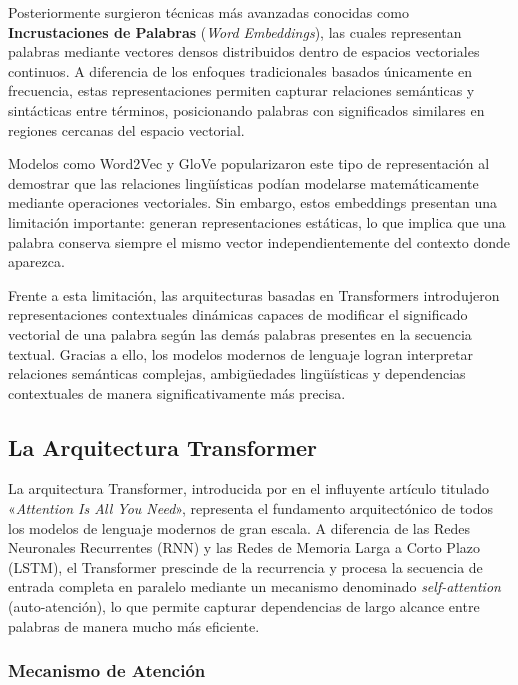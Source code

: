 Posteriormente surgieron técnicas más avanzadas conocidas como \textbf{Incrustaciones de Palabras} (\textit{Word Embeddings}), las cuales representan palabras mediante vectores densos distribuidos dentro de espacios vectoriales continuos. A diferencia de los enfoques tradicionales basados únicamente en frecuencia, estas representaciones permiten capturar relaciones semánticas y sintácticas entre términos, posicionando palabras con significados similares en regiones cercanas del espacio vectorial.

Modelos como Word2Vec \parencite{tec_mikolov2013word2vec} y GloVe \parencite{gl_pennington2014glove} popularizaron este tipo de representación al demostrar que las relaciones lingüísticas podían modelarse matemáticamente mediante operaciones vectoriales. Sin embargo, estos embeddings presentan una limitación importante: generan representaciones estáticas, lo que implica que una palabra conserva siempre el mismo vector independientemente del contexto donde aparezca.

Frente a esta limitación, las arquitecturas basadas en Transformers introdujeron representaciones contextuales dinámicas capaces de modificar el significado vectorial de una palabra según las demás palabras presentes en la secuencia textual. Gracias a ello, los modelos modernos de lenguaje logran interpretar relaciones semánticas complejas, ambigüedades lingüísticas y dependencias contextuales de manera significativamente más precisa.
\subsection{La Arquitectura Transformer}

La arquitectura Transformer, introducida por \cite{tec_vaswani2017attention} en el influyente artículo titulado «\textit{Attention Is All You Need}», representa el fundamento arquitectónico de todos los modelos de lenguaje modernos de gran escala. A diferencia de las Redes Neuronales Recurrentes (RNN) y las Redes de Memoria Larga a Corto Plazo (LSTM), el Transformer prescinde de la recurrencia y procesa la secuencia de entrada completa en paralelo mediante un mecanismo denominado \textit{self-attention} (auto-atención), lo que permite capturar dependencias de largo alcance entre palabras de manera mucho más eficiente.

\subsubsection{Mecanismo de Atención}

